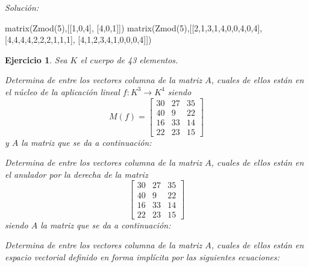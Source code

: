 \documentclass[12pt]{amsart}
\newtheorem{ejer}{Ejercicio}
\begin{document}
{\it Soluci\'on:}

\begin{sageblock}
matrix(Zmod(5),[[1,0,4],
[4,0,1]])
matrix(Zmod(5),[[2,1,3,1,4,0,0,4,0,4],
[4,4,4,4,2,2,2,1,1,1],
[4,1,2,3,4,1,0,0,0,4]])
\end{sageblock}



\begin{ejer} Sea $K$ el cuerpo de 43 elementos.
\newline
\noindent\begin{minipage}{\textwidth}
\begin{tcolorbox}[colback = green!20!white,title=Versión Núcleo]
Determina de entre los vectores columna de la matriz $A$, cuales de ellos están en el núcleo de la aplicación lineal $f:K^{3} \to K^{4}$ siendo  $$ M(f) = \left[\begin{array}{rrr}
30 & 27 & 35 \\
40 & 9 & 22 \\
16 & 33 & 14 \\
22 & 23 & 15
\end{array}\right] $$ y $A$ la matriz que se da a continuación:\end{tcolorbox}
\end{minipage} \newline
\noindent\begin{minipage}{\textwidth}
\begin{tcolorbox}[colback = blue!20!white,title=Versión Anulador]
Determina de entre los vectores columna de la matriz $A$, cuales de ellos están en el anulador por la derecha de la matriz $$ \left[\begin{array}{rrr}
30 & 27 & 35 \\
40 & 9 & 22 \\
16 & 33 & 14 \\
22 & 23 & 15
\end{array}\right] $$ siendo $A$ la matriz que se da a continuación:\end{tcolorbox}
\end{minipage} \newline
\noindent\begin{minipage}{\textwidth} 
\begin{tcolorbox}[colback = red!20!white,title=Versión Ecuaciones Implícitas]
Determina de entre los vectores columna de la matriz $A$, cuales de ellos están en espacio vectorial definido en forma implícita por las siguientes ecuaciones:

\end{tcolorbox}
\end{minipage}
\end{ejer}
\end{document}
